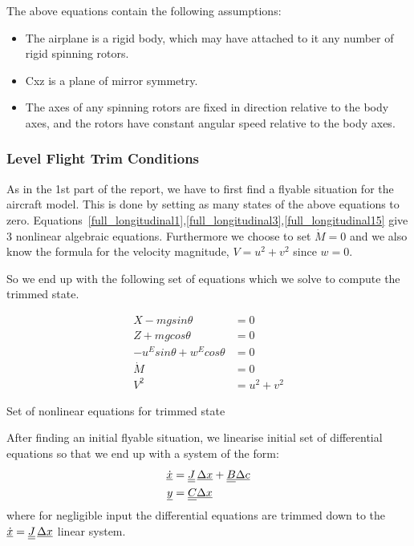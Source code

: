 The above equations contain the following assumptions:
\begin{itemize}
\item The airplane is a rigid body, which may have attached to it any number of
rigid spinning rotors.
\item Cxz is a plane of mirror symmetry.
\item The axes of any spinning rotors are fixed in direction relative to the body
axes, and the rotors have constant angular speed relative to the body axes.
\end{itemize}

\subsubsection{Level Flight Trim Conditions}
As in the 1st part of the report, we have to first find a flyable situation for
the aircraft model. This is done by setting as many states of the above
equations to zero.
Equations~\ref{full_longitudinal1},\ref{full_longitudinal3},\ref{full_longitudinal15}
give 3 nonlinear algebraic equations. Furthermore we choose to set $\dot{M} = 0$ and
we also know the formula for the velocity magnitude, $V = u^2 + v^2$ since $w = 0$.

So we end up with the following set of equations which we solve to compute the
trimmed state.

\begin{align}
    X - mgsin\theta &= 0\\
    Z + mgcos\theta &= 0\\
    -u^Esin\theta +  w^Ecos\theta &= 0\\
    \dot{M} &= 0\\
    V^2 &= u^2 + v^2
\end{align}
\begin{center}Set of nonlinear equations for trimmed state\end{center}

After finding an initial flyable situation, we linearise initial set of 
differential equations so that we end up with a system of the form:
\begin{align*}
    \underline{\dot{x}} &= \underline{\underline{J}}\,\underline{\Delta x} +
    \underline{\underline{B}}\underline{\Delta c}\\
    \underline{y} &= \underline{\underline{C}}\underline{\Delta x}
\end{align*}
where for negligible input the differential equations are trimmed down to the 
$\underline{\dot{x}} = \underline{\underline{J}}\,\underline{\Delta x}$ linear system.

